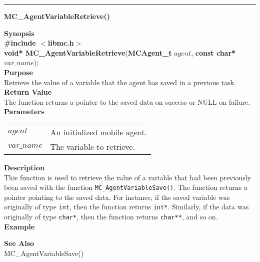 \noindent
\vspace{5pt}
\rule{6.5in}{0.015in}
\noindent
{}
{\LARGE \bf MC\_AgentVariableRetrieve()}\\
\label{api:MC_AgentVariableRetrieve()}

\noindent
{\bf Synopsis}\\
{\bf \#include $<$libmc.h$>$}\\
{\bf void* MC\_AgentVariableRetrieve}({\bf MCAgent\_t} $agent$, {\bf const char*} $var\_name$);\\

\noindent
{\bf Purpose}\\
Retrieve the value of a variable that the agent has saved in a previous task.\\

\noindent
{\bf Return Value}\\
The function returns a pointer to the saved data on success or NULL on failure.\\

\noindent
{\bf Parameters}
\vspace{-0.1in}
\begin{description}
\item
\begin{tabular}{p{10 mm}p{145 mm}} 
$agent$ & An initialized mobile agent.\\
$var\_name$ & The variable to retrieve.
\end{tabular}
\end{description}

\noindent
{\bf Description}\\
This function is used to retrieve the value of a variable that had been previously been
saved with the function \texttt{MC\_AgentVariableSave()}. The function returns a pointer
pointing to the saved data. For instance, if the saved variable was originally of type
\texttt{int}, then the function returns \texttt{int*}. Similarly, if the data was originally
of type \texttt{char*}, then the function returns \texttt{char**}, and so on.\\

\noindent
{\bf Example}\\
\noindent
{\footnotesize}

\noindent
{\bf See Also}\\
MC\_AgentVariableSave()

